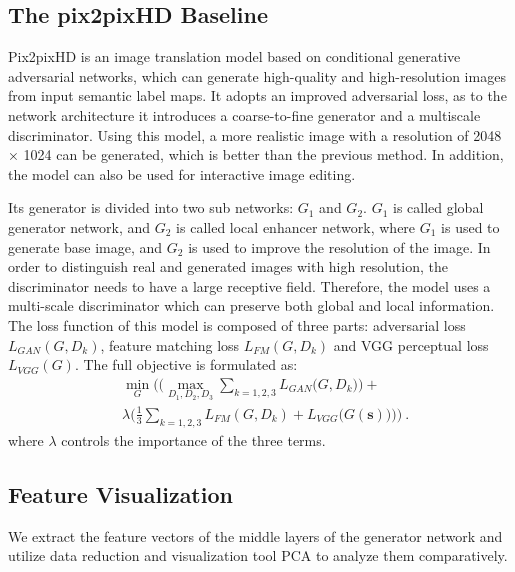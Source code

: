 \documentclass[10pt,twocolumn,letterpaper]{article}
\begin{document}
\subsection{The pix2pixHD Baseline}\label{sec:pix2pixhd}
Pix2pixHD\cite{pix2pixhd} is an image translation model based on conditional generative adversarial networks, which can generate high-quality and high-resolution images from input semantic label maps. 
It adopts an improved adversarial loss, as to the network architecture it introduces a coarse-to-fine generator and a multiscale discriminator. 
Using this model, a more realistic image with a resolution of 2048 × 1024 can be generated, which is better than the previous method. 
In addition, the model can also be used for interactive image editing.  

Its generator is divided into two sub networks: $G_1$ and $G_2$. 
$G_1$ is called global generator network, and $G_2$ is called local enhancer network, where $G_1$ is used to generate base image, and $G_2$ is used to improve the resolution of the image. 
In order to distinguish real and generated images with high resolution, the discriminator needs to have a large receptive field. 
Therefore, the model uses a multi-scale discriminator which can preserve both global and local information. 
The loss function of this model is composed of three parts: adversarial loss $L_{GAN}(G,D_k)$, feature matching loss $L_{FM}(G,D_k)$ and VGG perceptual loss $L_{VGG}(G)$. The full objective is formulated as:
\begin{equation}
\begin{split}
	&\underset{G}{\min}\Bigg(\bigg(\underset{D_1,D_2,D_3}{\max} \sum_{k=1,2,3}{L_{GAN}\big(G,D_k\big)}\bigg)+  \\
	&\lambda \bigg(\frac{1}{3}\sum_{k=1,2,3}{L_{FM}(G,D_k)}+L_{VGG}{\big(G(\boldsymbol{s})\big)}\bigg)\Bigg)~.
\end{split}
\end{equation}
\noindent
where $\lambda$ controls the importance of the three terms.

\subsection{Feature Visualization}\label{sec:visualize}
We extract the feature vectors of the middle layers of the generator network and utilize data reduction and visualization tool PCA to analyze them comparatively.
\end{document}
